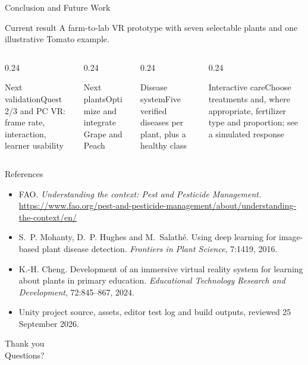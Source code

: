\documentclass[aspectratio=169,11pt]{beamer}
\begin{document}
\begin{frame}{Conclusion and Future Work}
  \begin{exampleblock}{Current result}
    A farm-to-lab VR prototype with seven selectable plants and one illustrative Tomato example.
  \end{exampleblock}
  \begin{columns}[T]
    \begin{column}{0.24\textwidth}
      \begin{block}{Next validation}\scriptsize Quest 2/3 and PC VR: frame rate, interaction, learner usability\end{block}
    \end{column}
    \begin{column}{0.24\textwidth}
      \begin{block}{Next plants}\scriptsize Optimize and integrate Grape and Peach\end{block}
    \end{column}
    \begin{column}{0.24\textwidth}
      \begin{block}{Disease system}\scriptsize Five verified diseases per plant, plus a healthy class\end{block}
    \end{column}
    \begin{column}{0.24\textwidth}
      \begin{block}{Interactive care}\scriptsize Choose treatments and, where appropriate, fertilizer type and proportion; see a simulated response\end{block}
    \end{column}
  \end{columns}
\end{frame}

\begin{frame}[allowframebreaks]{References}
  \small
  \begin{itemize}
    \item[{[1]}] FAO. \emph{Understanding the context: Pest and Pesticide Management.} \url{https://www.fao.org/pest-and-pesticide-management/about/understanding-the-context/en/}
    \item[{[2]}] S.~P. Mohanty, D.~P. Hughes and M.~Salath\'e. Using deep learning for image-based plant disease detection. \emph{Frontiers in Plant Science}, 7:1419, 2016.
    \item[{[3]}] K.-H. Cheng. Development of an immersive virtual reality system for learning about plants in primary education. \emph{Educational Technology Research and Development}, 72:845--867, 2024.
    \item[{[4]}] Unity project source, assets, editor test log and build outputs, reviewed 25 September 2026.
  \end{itemize}
\end{frame}

\begin{frame}[standout]
  Thank you\\[0.5em]
  {\normalsize Questions?}
\end{frame}
\end{document}
